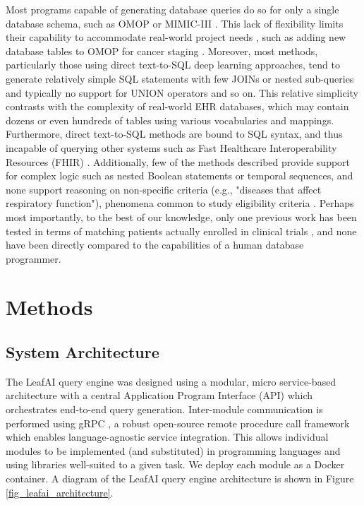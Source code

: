 \documentclass[../main.tex]{subfiles}
\begin{document}
Most programs capable of generating database queries do so for only a single database schema, such as OMOP or MIMIC-III \cite{johnson2016mimic}. This lack of flexibility limits their capability to accommodate real-world project needs \cite{belenkaya2021extending, peng2021towards, zoch2021adaption, warner2019hemonc, zhou2013evaluation, shin2019genomic, kwon2019development}, such as adding new database tables to OMOP for cancer staging \cite{belenkaya2021extending}. Moreover, most methods, particularly those using direct text-to-SQL deep learning approaches, tend to generate relatively simple SQL statements with few JOINs or nested sub-queries and typically no support for UNION operators and so on. This relative simplicity contrasts with the complexity of real-world EHR databases, which may contain dozens or even hundreds of tables using various vocabularies and mappings. Furthermore, direct text-to-SQL methods are bound to SQL syntax, and thus incapable of querying other systems such as Fast Healthcare Interoperability Resources (FHIR) \cite{bender2013hl7}. Additionally, few of the methods described provide support for complex logic such as nested Boolean statements or temporal sequences, and none support reasoning on non-specific criteria (e.g., "diseases that affect respiratory function"), phenomena common to study eligibility criteria \cite{wang2017classifying, ross2010analysis}. Perhaps most importantly, to the best of our knowledge, only one previous work has been tested in terms of matching patients actually enrolled in clinical trials \cite{zhang2020deepenroll}, and none have been directly compared to the capabilities of a human database programmer.

\section{Methods}

\subsection{System Architecture}

The LeafAI query engine was designed using a modular, micro service-based architecture with a central Application Program Interface (API) which orchestrates end-to-end query generation. Inter-module communication is performed using gRPC \cite{grpc}, a robust open-source remote procedure call framework which enables language-agnostic service integration. This allows individual modules to be implemented (and substituted) in programming languages and using libraries well-suited to a given task. We deploy each module as a Docker \cite{Docker} container. A diagram of the LeafAI query engine architecture is shown in Figure \ref{fig_leafai_architecture}. 
\end{document}
